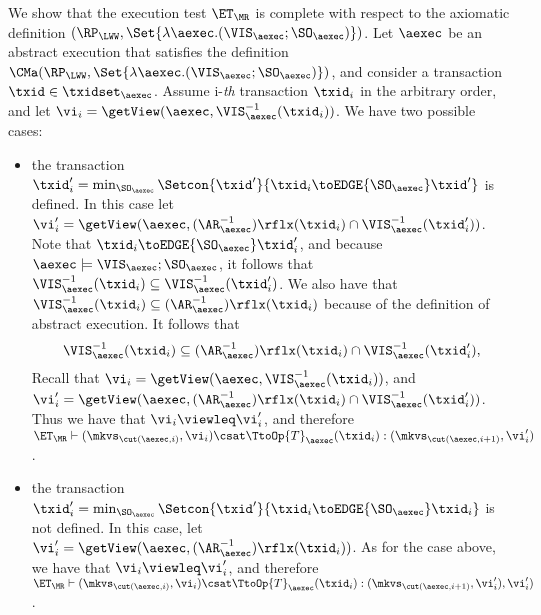 We show that the execution test $\ET_{\MR}$ is complete 
with respect to the axiomatic definition $(\RP_{\LWW}, \Set{\lambda \aexec.(\VIS_{\aexec};\SO_{\aexec})})$. 
Let $\aexec$ be an abstract execution that satisfies the definition
$\CMa(\RP_{\LWW}, \Set{\lambda \aexec.(\VIS_{\aexec};\SO_{\aexec})})$, 
and consider a transaction $\txid \in \txidset_{\aexec}$. 
Assume i-\emph{th} transaction \( \txid_i \) in the arbitrary order,
and let $\vi_i = \getView(\aexec, \VIS^{-1}_{\aexec}(\txid_{i}))$.
We have two possible cases: 
\begin{itemize}
    \item the transaction $\txid'_{i} = \min_{\SO_{\aexec}}\Setcon{\txid' }{ \txid_{i} \toEDGE{\SO_{\aexec}} \txid'}$ is 
defined. In this case let $\vi'_{i} =\getView(\aexec, (\AR^{-1}_{\aexec})\rflx(\txid_{i}) \cap \VIS^{-1}_{\aexec}(\txid'_{i}))$. 
Note that $\txid_{i} \toEDGE{\SO_{\aexec}} \txid'_{i}$, and because $\aexec \models \VIS_{\aexec} ; \SO_{\aexec}$, 
it follows that $\VIS^{-1}_{\aexec}(\txid_{i}) \subseteq \VIS^{-1}_{\aexec}(\txid'_{i})$. 
We also have that $\VIS^{-1}_{\aexec}(\txid_{i}) \subseteq (\AR^{-1}_{\aexec})\rflx(\txid_{i})$ because of 
the definition of abstract execution. It follows that 
\[
\VIS^{-1}_{\aexec}(\txid_{i}) \subseteq (\AR^{-1}_{\aexec})\rflx(\txid_{i}) \cap \VIS^{-1}_{\aexec}(\txid'_{i}),
\]
Recall that  $\vi_i = \getView(\aexec, \VIS^{-1}_{\aexec}(\txid_{i}))$, 
and $\vi'_{i} =\getView(\aexec, (\AR^{-1}_{\aexec})\rflx(\txid_{i}) \cap \VIS^{-1}_{\aexec}(\txid'_{i}))$. 
Thus we have that $\vi_i \viewleq \vi'_{i}$, and therefore $\ET_{\MR} \vdash (\mkvs_{\cut(\aexec, i)}, \vi_i) 
\csat \TtoOp{T}_{\aexec}(\txid_{i}) : (\mkvs_{\cut(\aexec, i+1)},\vi'_{i})$. 
\item the transaction $\txid'_{i} = \min_{\SO_{\aexec}}\Setcon{\txid' }{ \txid_{i} \toEDGE{\SO_{\aexec}} \txid_{i}}$ 
is not defined. In this case, let $\vi'_{i} = \getView(\aexec, (\AR^{-1}_{\aexec})\rflx(\txid_{i}))$. 
As for the case above, we have that $\vi_i \viewleq \vi'_{i}$, and therefore 
$\ET_{\MR} \vdash (\mkvs_{\cut(\aexec, i)}, \vi_i) \csat \TtoOp{T}_{\aexec}(\txid_{i}) : (\mkvs_{\cut(\aexec, i+1)},\vi'_{i}),\vi'_{i})$. 
\end{itemize}
